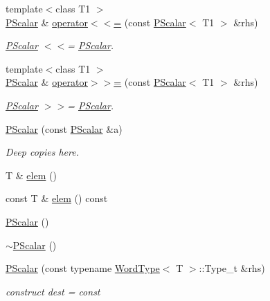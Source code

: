 \begin{DoxyCompactItemize}
{\footnotesize template$<$class T1 $>$ }\\\mbox{\hyperlink{classENSEM_1_1PScalar}{P\+Scalar}} \& \mbox{\hyperlink{classENSEM_1_1PScalar_ade643675ab6ef041676e1098ac740b29}{operator$<$$<$=}} (const \mbox{\hyperlink{classENSEM_1_1PScalar}{P\+Scalar}}$<$ T1 $>$ \&rhs)
\begin{DoxyCompactList}\small\item\em \mbox{\hyperlink{classENSEM_1_1PScalar}{P\+Scalar}} $<$$<$= \mbox{\hyperlink{classENSEM_1_1PScalar}{P\+Scalar}}. \end{DoxyCompactList}\item 
{\footnotesize template$<$class T1 $>$ }\\\mbox{\hyperlink{classENSEM_1_1PScalar}{P\+Scalar}} \& \mbox{\hyperlink{classENSEM_1_1PScalar_a8fe07cd0462ddff9e3d0858ebe29e77c}{operator$>$$>$=}} (const \mbox{\hyperlink{classENSEM_1_1PScalar}{P\+Scalar}}$<$ T1 $>$ \&rhs)
\begin{DoxyCompactList}\small\item\em \mbox{\hyperlink{classENSEM_1_1PScalar}{P\+Scalar}} $>$$>$= \mbox{\hyperlink{classENSEM_1_1PScalar}{P\+Scalar}}. \end{DoxyCompactList}\item 
\mbox{\hyperlink{classENSEM_1_1PScalar_a2bf292f92c6654475bf2bc93c48adcd1}{P\+Scalar}} (const \mbox{\hyperlink{classENSEM_1_1PScalar}{P\+Scalar}} \&a)
\begin{DoxyCompactList}\small\item\em Deep copies here. \end{DoxyCompactList}\item 
T \& \mbox{\hyperlink{classENSEM_1_1PScalar_aac65f47beae4fa376f101587344c1589}{elem}} ()
\item 
const T \& \mbox{\hyperlink{classENSEM_1_1PScalar_ac20d84af6de415de7ad63292ad278542}{elem}} () const
\item 
\mbox{\hyperlink{classENSEM_1_1PScalar_a0f70e3ea4cc0d0f1753a2ed87ecf2e04}{P\+Scalar}} ()
\item 
\mbox{\hyperlink{classENSEM_1_1PScalar_a136d4a70f16eadecdf840f4e9d4b1b7c}{$\sim$\+P\+Scalar}} ()
\item 
\mbox{\hyperlink{classENSEM_1_1PScalar_aeb51f7fd0a7c5d9b7465ceabdb9311f8}{P\+Scalar}} (const typename \mbox{\hyperlink{structENSEM_1_1WordType}{Word\+Type}}$<$ T $>$\+::Type\+\_\+t \&rhs)
\begin{DoxyCompactList}\small\item\em construct dest = const \end{DoxyCompactList}\item 

\end{DoxyCompactItemize}
